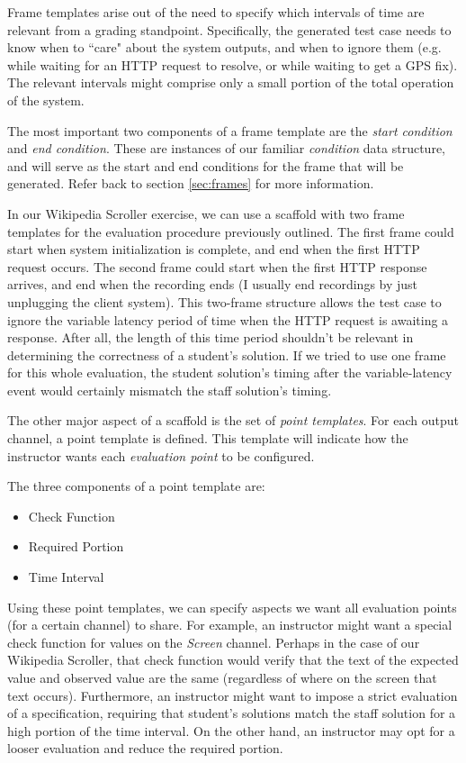 \documentclass[12pt]{article}
\begin{document}
Frame templates arise out of the need to specify which intervals of time are relevant from a grading standpoint.  Specifically, the generated test case needs to know when to ``care" about the system outputs, and when to ignore them (e.g. while waiting for an HTTP request to resolve, or while waiting to get a GPS fix).  The relevant intervals might comprise only a small portion of the total operation of the system.

The most important two components of a frame template are the \textit{start condition} and \textit{end condition}.  These are instances of our familiar \textit{condition} data structure, and will serve as the start and end conditions for the frame that will be generated.  Refer back to section \ref{sec:frames} for more information.

In our Wikipedia Scroller exercise, we can use a scaffold with two frame templates for the evaluation procedure previously outlined.  The first frame could start when system initialization is complete, and end when the first HTTP request occurs.  The second frame could start when the first HTTP response arrives, and end when the recording ends (I usually end recordings by just unplugging the client system).  This two-frame structure allows the test case to ignore the variable latency period of time when the HTTP request is awaiting a response.  After all, the length of this time period shouldn't be relevant in determining the correctness of a student's solution.  If we tried to use one frame for this whole evaluation, the student solution's timing after the variable-latency event would certainly mismatch the staff solution's timing.

The other major aspect of a scaffold is the set of \textit{point templates}.  For each output channel, a point template is defined.  This template will indicate how the instructor wants each \textit{evaluation point} to be configured.

The three components of a point template are:

\begin{itemize}
\item Check Function
\item Required Portion
\item Time Interval
\end{itemize}

Using these point templates, we can specify aspects we want all evaluation points (for a certain channel) to share.  For example, an instructor might want a special check function for values on the \textit{Screen} channel.  Perhaps in the case of our Wikipedia Scroller, that check function would verify that the text of the expected value and observed value are the same (regardless of where on the screen that text occurs).  Furthermore, an instructor might want to impose a strict evaluation of a specification, requiring that student's solutions match the staff solution for a high portion of the time interval.  On the other hand, an instructor may opt for a looser evaluation and reduce the required portion.
\end{document}
